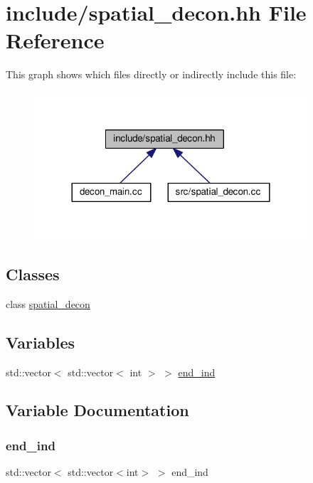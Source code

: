 \hypertarget{spatial__decon_8hh}{}\section{include/spatial\+\_\+decon.hh File Reference}
\label{spatial__decon_8hh}
This graph shows which files directly or indirectly include this file\+:
\nopagebreak
\begin{figure}[H]
\begin{center}
\leavevmode
\includegraphics[width=288pt]{spatial__decon_8hh__dep__incl}
\end{center}
\end{figure}
\subsection*{Classes}
\begin{DoxyCompactItemize}
\item 
class \mbox{\hyperlink{classspatial__decon}{spatial\+\_\+decon}}
\end{DoxyCompactItemize}
\subsection*{Variables}
\begin{DoxyCompactItemize}
\item 
std\+::vector$<$ std\+::vector$<$ int $>$ $>$ \mbox{\hyperlink{spatial__decon_8hh_a3256ec6aeca97c99b8e9901bfda6e9ab}{end\+\_\+ind}}
\end{DoxyCompactItemize}


\subsection{Variable Documentation}
\mbox{\label{spatial__decon_8hh_a3256ec6aeca97c99b8e9901bfda6e9ab}} 
\subsubsection{\texorpdfstring{end\+\_\+ind}{end\_ind}}
{\footnotesize\ttfamily std\+::vector$<$ std\+::vector$<$int$>$ $>$ end\+\_\+ind}

